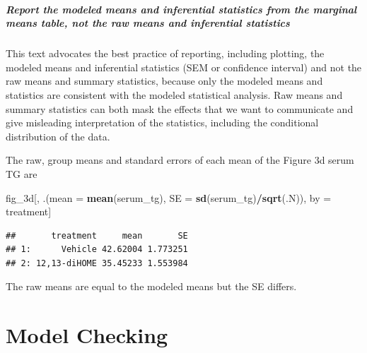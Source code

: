 \documentclass[]{book}
\newenvironment{Shaded}{\begin{snugshade}}{\end{snugshade}}
\newcommand{\DataTypeTok}[1]{\textcolor[rgb]{0.13,0.29,0.53}{#1}}
\newcommand{\KeywordTok}[1]{\textcolor[rgb]{0.13,0.29,0.53}{\textbf{#1}}}
\newcommand{\NormalTok}[1]{#1}
\newcommand{\OperatorTok}[1]{\textcolor[rgb]{0.81,0.36,0.00}{\textbf{#1}}}
\newcommand{\StringTok}[1]{\textcolor[rgb]{0.31,0.60,0.02}{#1}}
\let\oldparagraph\paragraph
\renewcommand{\paragraph}[1]{\oldparagraph{#1}\mbox{}}
\begin{document}
\hypertarget{report-the-modeled-means-and-inferential-statistics-from-the-marginal-means-table-not-the-raw-means-and-inferential-statistics}{%
\paragraph{Report the modeled means and inferential statistics from the marginal means table, not the raw means and inferential statistics}\label{report-the-modeled-means-and-inferential-statistics-from-the-marginal-means-table-not-the-raw-means-and-inferential-statistics}}

This text advocates the best practice of reporting, including plotting, the modeled means and inferential statistics (SEM or confidence interval) and not the raw means and summary statistics, because only the modeled means and statistics are consistent with the modeled statistical analysis. Raw means and summary statistics can both mask the effects that we want to communicate and give misleading interpretation of the statistics, including the conditional distribution of the data.

The raw, group means and standard errors of each mean of the Figure 3d serum TG are

\begin{Shaded}
\begin{Highlighting}[]
\NormalTok{fig_3d[, .(}\DataTypeTok{mean =} \KeywordTok{mean}\NormalTok{(serum_tg),}
           \DataTypeTok{SE =} \KeywordTok{sd}\NormalTok{(serum_tg)}\OperatorTok{/}\KeywordTok{sqrt}\NormalTok{(.N)),}
\NormalTok{       by =}\StringTok{ }\NormalTok{treatment]}
\end{Highlighting}
\end{Shaded}

\begin{verbatim}
##       treatment     mean       SE
## 1:      Vehicle 42.62004 1.773251
## 2: 12,13-diHOME 35.45233 1.553984
\end{verbatim}

The raw means are equal to the modeled means but the SE differs.

\hypertarget{model-checking}{%
\chapter{Model Checking}\label{model-checking}}
\end{document}
